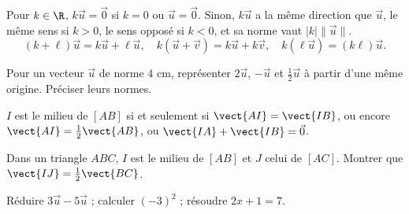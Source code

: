 \begin{keypoint}
Pour $k\in\R$, $k\vec u=\vec0$ si $k=0$ ou $\vec u=\vec0$. Sinon, $k\vec u$ a la même direction que $\vec u$, le même sens si $k>0$, le sens opposé si $k<0$, et sa norme vaut $|k|\|\vec u\|$.
\[(k+\ell)\vec u=k\vec u+\ell\vec u,\quad k(\vec u+\vec v)=k\vec u+k\vec v,\quad k(\ell\vec u)=(k\ell)\vec u.\]
\end{keypoint}
\begin{example}Pour un vecteur $\vec u$ de norme $4$ cm, représenter $2\vec u$, $-\vec u$ et $\frac12\vec u$ à partir d'une même origine. Préciser leurs normes.\end{example}
\begin{keypoint}
$I$ est le milieu de $[AB]$ si et seulement si $\vect{AI}=\vect{IB}$, ou encore $\vect{AI}=\frac12\vect{AB}$, ou $\vect{IA}+\vect{IB}=\vec0$.
\end{keypoint}
\begin{example}Dans un triangle $ABC$, $I$ est le milieu de $[AB]$ et $J$ celui de $[AC]$. Montrer que $\vect{IJ}=\frac12\vect{BC}$.\end{example}
\begin{fluency}[5--10 min]Réduire $3\vec u-5\vec u$ ; calculer $(-3)^2$ ; résoudre $2x+1=7$.\end{fluency}

